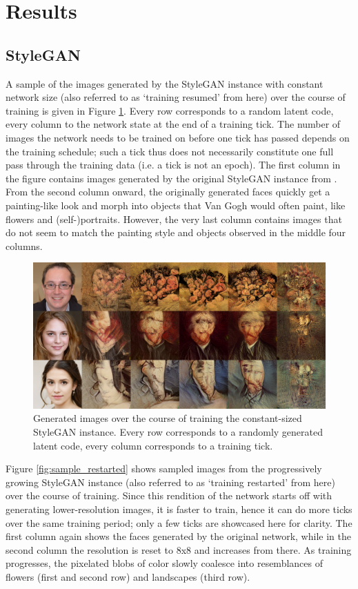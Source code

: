 \documentclass{article}
\begin{document}
\section{Results}

\subsection{StyleGAN}
A sample of the images generated by the StyleGAN instance with constant network size (also referred to as `training resumed' from here) over the course of training is given in Figure \ref{fig:sample_resumed}. Every row corresponds to a random latent code, every column to the network state at the end of a training tick. The number of images the network needs to be trained on before one tick has passed depends on the training schedule; such a tick thus does not necessarily constitute one full pass through the training data (i.e. a tick is not an epoch). The first column in the figure contains images generated by the original StyleGAN instance from \cite{karras2019stylebased}. From the second column onward, the originally generated faces quickly get a painting-like look and morph into objects that Van Gogh would often paint, like flowers and (self-)portraits. However, the very last column contains images that do not seem to match the painting style and objects observed in the middle four columns.

\begin{figure}
    \centering
    \includegraphics[width=0.5\linewidth]{report/img/morphing.png}
    \caption{Generated images over the course of training the constant-sized StyleGAN instance. Every row corresponds to a randomly generated latent code, every column corresponds to a training tick.}
    \label{fig:sample_resumed}
\end{figure}

Figure \ref{fig:sample_restarted} shows sampled images from the progressively growing StyleGAN instance (also referred to as `training restarted' from here) over the course of training. Since this rendition of the network starts off with generating lower-resolution images, it is faster to train, hence it can do more ticks over the same training period; only a few ticks are showcased here for clarity. The first column again shows the faces generated by the original network, while in the second column the resolution is reset to 8x8 and increases from there. As training progresses, the pixelated blobs of color slowly coalesce into resemblances of flowers (first and second row) and landscapes (third row).
\end{document}
